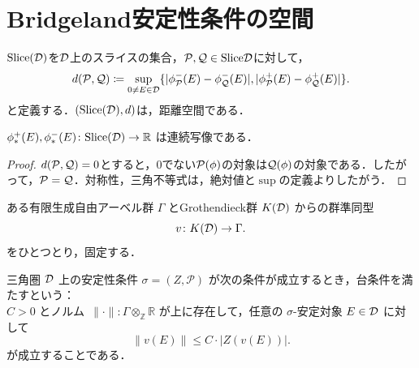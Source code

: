 \section{Bridgeland安定性条件の空間}
\begin{defn}\cite{Bri07}
$\mathrm{Slice(\D)}$を$\D$上のスライスの集合，$\mathcal P,\mathcal Q\in\mathrm{Slice} \D$に対して，
\[d(\mathcal P,\mathcal Q)\coloneq\sup_{0\neq E\in\D}\{|\phi^-_{\P}(E)-\phi_{\Q}^-(E)|,|\phi^+_{\P}(E)-\phi_{\Q}^+(E)|\}.\]
と定義する．$(\mathrm{Slice(\D)},d)$は，距離空間である．
\end{defn}
\begin{lemm}
	$\phi_{*}^+(E),\phi_{*}^-(E)\colon \mathrm{Slice(\D)}\rightarrow\RR$
	は連続写像である．
\end{lemm}
\begin{proof}
	$d(\P,\Q)=0$とすると，$0$でない$\P(\phi)$の対象は$\Q(\phi)$の対象である．したがって，$\P=\Q$．対称性，三角不等式は，絶対値と$\sup$の定義よりしたがう．
\end{proof}

ある有限生成自由アーベル群 $\Gamma$ とGrothendieck群 $K(\D)$ からの群準同型
\[
v \colon K(\D) \to \Gamma .
\]
をひとつとり，固定する．
\begin{defn}\cite{KS08}
三角圏 $\D$ 上の安定性条件 $\sigma = (Z, \mathcal{P})$ が次の条件が成立するとき，台条件を満たすという：\\
$C > 0$ とノルム\ $\|\cdot\|\colon\Gamma \otimes_{\mathbb{Z}} \mathbb{R} $ が上に存在して，任意の $\sigma$-安定対象 $E \in \D$ に対して
\[
\|v(E)\| \leq C \cdot |Z(v(E))| .
\]
が成立することである．
\end{defn}

